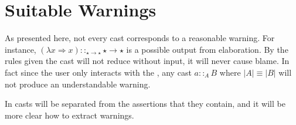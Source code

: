 \section{Suitable Warnings}
 
As presented here, not every cast corresponds to a reasonable warning.
For instance, $\left(\lambda x\Rightarrow x\right)::_{\star\rightarrow\star}\star\rightarrow\star$ is a possible output from elaboration.
By the rules given the cast will not reduce without input, it will never cause blame.
In fact since the user only interacts with the \slang{}, any cast $a::_{A}B$ where $|A|\equiv|B|$ will not produce an understandable warning.
 
 
 
In  casts will be separated from the assertions that they contain, and it will be more clear how to extract warnings.
